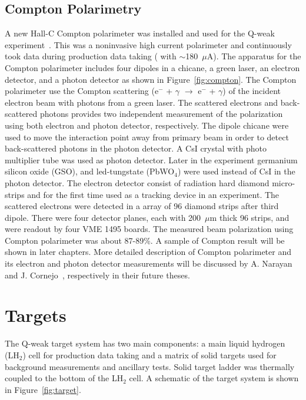 \subsection{Compton Polarimetry}%
\label{Compton Polarimetry}

A new Hall-C Compton polarimeter was installed and used for the Q-weak experiment~\cite{presentation:amar_compton_1732}. This was a noninvasive high current polarimeter and continuously took data during production data taking ( with $\sim$180~$\mu$A). The apparatus for the Compton polarimeter includes four dipoles in a chicane, a green laser, an electron detector, and a photon detector as shown in Figure~\ref{fig:compton}. The Compton polarimeter use the Compton scattering (e$^{-}$ + $\gamma$ $\rightarrow$ e$^{-}$ + $\gamma$) of the incident electron beam with photons from a green laser. The scattered electrons and back-scattered photons provides two independent measurement of the polarization using  both electron and photon detector, respectively. The dipole chicane were used to move the interaction point away from primary beam in order to detect back-scattered photons in the photon detector. A CsI crystal with photo multiplier tube was used as photon detector. Later in the experiment germanium silicon oxide (GSO), and led-tungstate (PbWO$_{4}$) were used instead of CsI in the photon detector. The electron detector consist of radiation hard diamond micro-strips and for the first time used as a tracking device in an experiment. The scattered electrons were detected in a array of 96 diamond strips after third dipole. There were four detector planes, each with 200~$\mu$m thick 96 strips, and were readout by four VME 1495 boards. The measured beam polarization using Compton polarimeter was about 87-89\%. A sample of Compton result will be shown in later chapters. More detailed description of Compton polarimeter and its electron and photon detector measurements will be discussed by A. Narayan ~\cite{amar_compton_thesis} and J. Cornejo~\cite{carlos_compton_thesis}, respectively in their future theses.


\section{Targets}%
\label{Targets}

The Q-weak target system has two main components: a main liquid hydrogen (LH$_{2}$) cell for production data taking and a matrix of solid targets used for background measurements and ancillary tests. Solid target ladder was thermally coupled to the bottom of the LH$_{2}$ cell. A schematic of the target system is shown in Figure~\ref{fig:target}.


